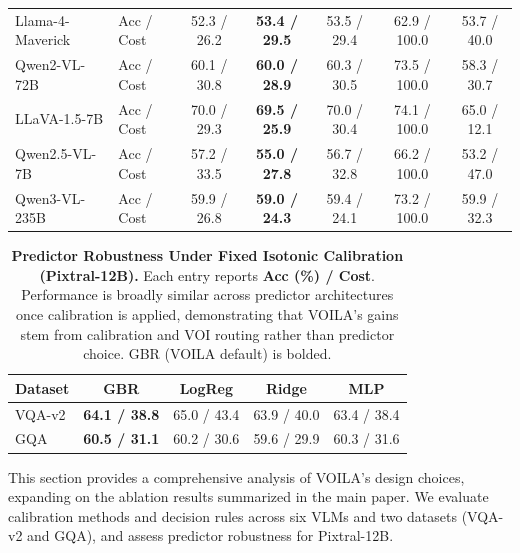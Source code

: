 \begin{table}[p]
{\begin{tabular}{llccccc}
Llama-4-Maverick
& Acc / Cost
& 52.3 / 26.2
& \textbf{53.4 / 29.5}
& 53.5 / 29.4
& 62.9 / 100.0
& 53.7 / 40.0 \\

Qwen2-VL-72B
& Acc / Cost
& 60.1 / 30.8
& \textbf{60.0 / 28.9}
& 60.3 / 30.5
& 73.5 / 100.0
& 58.3 / 30.7 \\

LLaVA-1.5-7B
& Acc / Cost
& 70.0 / 29.3
& \textbf{69.5 / 25.9}
& 70.0 / 30.4
& 74.1 / 100.0
& 65.0 / 12.1 \\

Qwen2.5-VL-7B
& Acc / Cost
& 57.2 / 33.5
& \textbf{55.0 / 27.8}
& 56.7 / 32.8
& 66.2 / 100.0
& 53.2 / 47.0 \\

Qwen3-VL-235B
& Acc / Cost
& 59.9 / 26.8
& \textbf{59.0 / 24.3}
& 59.4 / 24.1
& 73.2 / 100.0
& 59.9 / 32.3 \\

\bottomrule
\end{tabular}
}
\end{table}

\begin{table}[p]
\centering
\small
\caption{
\textbf{Predictor Robustness Under Fixed Isotonic Calibration (Pixtral-12B).}
Each entry reports \textbf{Acc (\%) / Cost}.
Performance is broadly similar across predictor architectures once calibration is applied, demonstrating that \textsc{VOILA}'s gains stem from calibration and VOI routing rather than predictor choice.
GBR (\textsc{VOILA} default) is bolded.
}
\label{tab:predictor_robustness_extended}
\label{tab:predictor_robustness_pixtral}
\setlength{\tabcolsep}{5pt}
\begin{tabular}{lcccc}
\toprule
\textbf{Dataset} & \textbf{GBR} & \textbf{LogReg} & \textbf{Ridge} & \textbf{MLP} \\
\midrule
VQA-v2 & \textbf{64.1 / 38.8} & 65.0 / 43.4 & 63.9 / 40.0 & 63.4 / 38.4 \\
GQA    & \textbf{60.5 / 31.1} & 60.2 / 30.6 & 59.6 / 29.9 & 60.3 / 31.6 \\
\bottomrule
\end{tabular}
\end{table}


This section provides a comprehensive analysis of \textsc{VOILA}'s design choices, expanding on the ablation results summarized in the main paper.
We evaluate calibration methods and decision rules across six VLMs and two datasets (VQA-v2 and GQA), and assess predictor robustness for Pixtral-12B.

